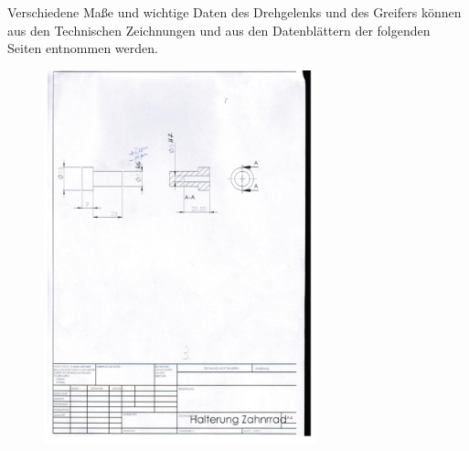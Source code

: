Verschiedene Maße und wichtige Daten des Drehgelenks und des Greifers können aus den Technischen Zeichnungen und aus den Datenblättern der folgenden Seiten entnommen werden.\\
\newline
\begin{figure}[htbp] 
  \centering
     \includegraphics[width=0.7\textwidth]{Anhang/Technische_Zeichnungen_Greifer/1.jpg}
  \label{fig:Bild1}
\end{figure}


